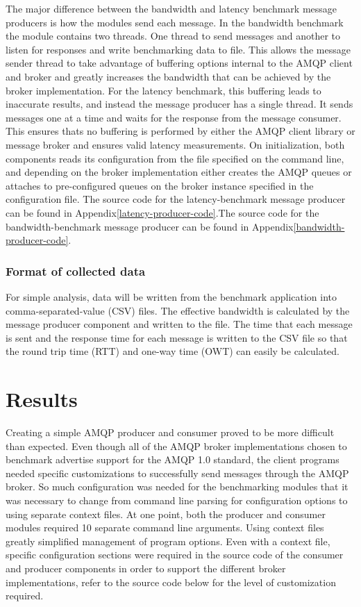 \documentclass{thesis}
\begin{document}
The major difference between the bandwidth and latency benchmark message producers is how the modules send each message.  In the bandwidth benchmark the module contains two threads.  One thread to send messages and another to listen for responses and write benchmarking data to file.  This allows the message sender thread to take advantage of buffering options internal to the AMQP client and broker and greatly increases the bandwidth that can be achieved by the broker implementation.  For the latency benchmark, this buffering leads to inaccurate results, and instead the message producer has a single thread.  It sends messages one at a time and waits for the response from the message consumer.  This ensures thats no buffering is performed by either the AMQP client library or message broker and ensures valid latency measurements.   
On initialization, both components reads its configuration from the file specified on the command line, and depending on the broker implementation either creates the AMQP queues or attaches to pre-configured queues on the broker instance specified in the configuration file.  
The source code for the latency-benchmark message producer can be found in Appendix\ref{latency-producer-code}.The source code for the bandwidth-benchmark message producer can be found in Appendix\ref{bandwidth-producer-code}.

\subsection{Format of collected data}
For simple analysis, data will be written from the benchmark application into comma-separated-value (CSV) files.  The effective bandwidth is calculated by the message producer component and written to the file.  The time that each message is sent and the response time for each message is written to the CSV file so that the round trip time (RTT) and one-way time (OWT) can easily be calculated.

\chapter{Results}
Creating a simple AMQP producer and consumer proved to be more difficult than expected.  Even though all of the AMQP broker implementations chosen to benchmark advertise support for the AMQP 1.0 standard, the client programs needed specific customizations to successfully send messages through the AMQP broker.   So much configuration was needed for the benchmarking modules that it was necessary to change from command line parsing for configuration options to using separate context files.  At one point, both the producer and consumer modules required 10 separate command line arguments.  Using context files greatly simplified management of program options.  Even with a context file, specific configuration sections were required in the source code of the consumer and producer components in order to support the different broker implementations, refer to the source code below for the level of customization required.
\end{document}
